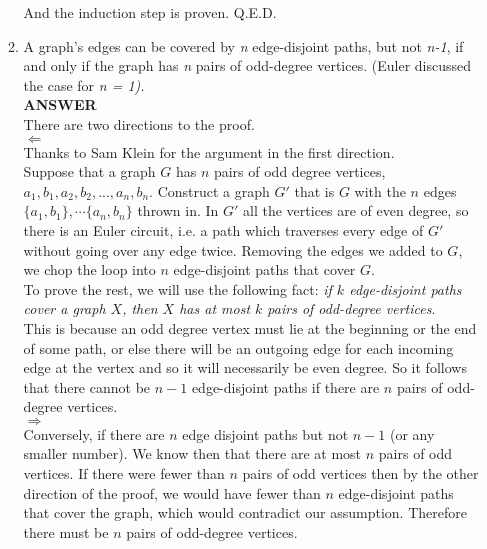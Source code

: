 \documentclass{article}
\begin{document}
\begin{enumerate}
\begin{enumerate}
And the induction step is proven. Q.E.D.
\item A graph's edges can be covered
by \textit{n} edge-disjoint paths, but not \textit{n-1}, if and
only if the graph has \textit{n} pairs of odd-degree vertices.
(Euler discussed the case for \textit{n = 1).} \\\vskip 10pt
\textbf{ANSWER} \\
There are two directions to the proof.\\
 $\Leftarrow$ \\
Thanks to Sam Klein for the argument in the first direction. \\
Suppose that a graph $G$ has $n$ pairs of odd degree vertices,
$a_1, b_1, a_2, b_2 , ... , a_n, b_n$. Construct a graph $G'$ that
is $G$ with the $n$ edges $\{ a_1, b_1 \}, \cdots \{ a_n, b_n \}$
thrown in. In $G'$ all the vertices are of even degree, so there
is an Euler circuit, i.e. a path which traverses every edge of
$G'$ without going over any edge twice. Removing the edges we
added to $G$, we chop the loop into $n$ edge-disjoint paths that
cover $G$. \\

To prove the rest, we will use the following fact: \textit{ if $k$
edge-disjoint paths cover a graph $X$, then $X$ has at most $k$
pairs of odd-degree vertices}. \\

This is because an odd degree vertex must lie at the beginning or
the end of some path, or else there will be an outgoing edge for
each incoming edge at the vertex and so it will necessarily be
even degree.  So it follows that there cannot be $n-1$
edge-disjoint paths if there are $n$ pairs of odd-degree
vertices.\\

$\Rightarrow$ \\
 Conversely, if there are $n$ edge disjoint paths but
not $n-1$ (or any smaller number). We know then that there are at
most $n$ pairs of odd vertices. If there were fewer than $n$ pairs
of odd vertices then by the other direction of the proof, we would
have fewer than $n$ edge-disjoint paths that cover the graph,
which would contradict our assumption. Therefore there must be $n$
pairs of odd-degree vertices.

\end{enumerate}


\end{enumerate}
\end{document}
